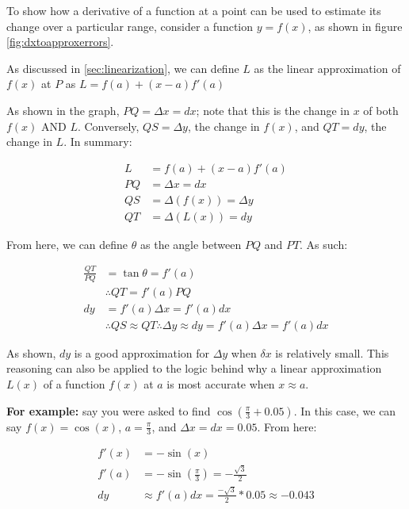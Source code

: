 \documentclass[12pt]{article}
\begin{document}
To show how a derivative of a function at a point can be used to estimate its change over a particular range, consider a function $y=f(x)$, as shown in figure \ref{fig:dxtoapproxerrors}.

As discussed in \ref{sec:linearization}, we can define $L$ as the linear approximation of $f(x)$ at $P$ as $L = f(a) + (x-a)f'(a)$

As shown in the graph, $PQ = \Delta x = dx$; note that this is the change in $x$ of both $f(x)$ AND $L$. Conversely, $QS = \Delta y$, the change in $f(x)$, and $QT = dy$, the change in $L$. In summary:

\begin{equation}
    \begin{split}
     L &= f(a) + (x-a)f'(a)\\
     PQ &= \Delta x = dx\\
     QS &= \Delta (f(x)) = \Delta y\\
     QT &= \Delta (L(x)) = dy
    \end{split}
\end{equation}

From here, we can define $\theta$ as the angle between $PQ$ and $PT$. As such:

\begin{equation}
    \begin{split}
        \frac{QT}{PQ} &= \tan \theta = f'(a)\\
        &\therefore QT = f'(a)PQ\\
        dy &= f'(a)\Delta x =  f'(a) dx\\
        &\therefore QS \approx QT \therefore \Delta y \approx dy = f'(a) \Delta x = f'(a) dx
    \end{split}
\end{equation}

As shown, $dy$ is a good approximation for $\Delta y$ when $\delta x$ is relatively small. This reasoning can also be applied to the logic behind why a linear approximation $L(x)$ of a function $f(x)$ at $a$ is most accurate when $x \approx a$.

\textbf{For example:} say you were asked to find $\cos(\frac{\pi}{3}+0.05)$. In this case, we can say $f(x) = \cos(x)$, $a = \frac{\pi}{3}$, and $\Delta x = dx = 0.05$. From here:

\begin{equation}
    \begin{split}
        f'(x) &= -\sin(x)\\
        f'(a) &= -\sin(\frac{\pi}{3}) = -\frac{\sqrt{3}}{2}\\
        dy &\approx f'(a)dx = \frac{-\sqrt{3}}{2}*0.05 \approx -0.043
    \end{split}
\end{equation}
\end{document}
